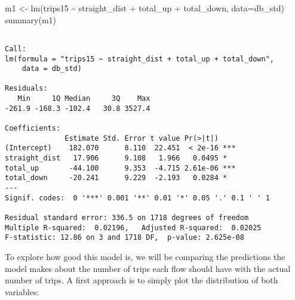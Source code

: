 \documentclass[
  letterpaper,
  krantz2]{style/krantz}
\newenvironment{Shaded}{\begin{snugshade}}{\end{snugshade}}
\newcommand{\AttributeTok}[1]{\textcolor[rgb]{0.40,0.45,0.13}{#1}}
\newcommand{\FunctionTok}[1]{\textcolor[rgb]{0.28,0.35,0.67}{#1}}
\newcommand{\NormalTok}[1]{\textcolor[rgb]{0.00,0.23,0.31}{#1}}
\newcommand{\OtherTok}[1]{\textcolor[rgb]{0.00,0.23,0.31}{#1}}
\newcommand{\StringTok}[1]{\textcolor[rgb]{0.13,0.47,0.30}{#1}}
\begin{document}
\begin{Shaded}
\begin{Highlighting}[]
\NormalTok{m1 }\OtherTok{\textless{}{-}} \FunctionTok{lm}\NormalTok{(}\StringTok{\textquotesingle{}trips15 \textasciitilde{} straight\_dist + total\_up + total\_down\textquotesingle{}}\NormalTok{, }\AttributeTok{data=}\NormalTok{db\_std)}
\FunctionTok{summary}\NormalTok{(m1)}
\end{Highlighting}
\end{Shaded}

\begin{verbatim}

Call:
lm(formula = "trips15 ~ straight_dist + total_up + total_down", 
    data = db_std)

Residuals:
   Min     1Q Median     3Q    Max 
-261.9 -168.3 -102.4   30.8 3527.4 

Coefficients:
              Estimate Std. Error t value Pr(>|t|)    
(Intercept)    182.070      8.110  22.451  < 2e-16 ***
straight_dist   17.906      9.108   1.966   0.0495 *  
total_up       -44.100      9.353  -4.715 2.61e-06 ***
total_down     -20.241      9.229  -2.193   0.0284 *  
---
Signif. codes:  0 '***' 0.001 '**' 0.01 '*' 0.05 '.' 0.1 ' ' 1

Residual standard error: 336.5 on 1718 degrees of freedom
Multiple R-squared:  0.02196,   Adjusted R-squared:  0.02025 
F-statistic: 12.86 on 3 and 1718 DF,  p-value: 2.625e-08
\end{verbatim}

To explore how good this model is, we will be comparing the predictions
the model makes about the number of trips each flow should have with the
actual number of trips. A first approach is to simply plot the
distribution of both variables:
\end{document}
